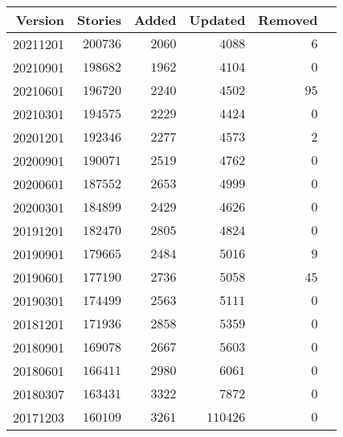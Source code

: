 \documentclass[hidelinks,a4paper,12pt]{article}
\begin{document}
\begin{center}
\begin{tabular}{|r|r|r|r|r|r|} \hline
\textbf{Version} & \textbf{Stories} & \textbf{Added} & \textbf{Updated} & \textbf{Removed} \\ \hline
20211201         & $200736$         & $2060$         & $4088$           & $6$              \\ \hline
20210901         & $198682$         & $1962$         & $4104$           & $0$              \\ \hline
20210601         & $196720$         & $2240$         & $4502$           & $95$             \\ \hline
20210301         & $194575$         & $2229$         & $4424$           & $0$              \\ \hline
20201201         & $192346$         & $2277$         & $4573$           & $2$              \\ \hline
20200901         & $190071$         & $2519$         & $4762$           & $0$              \\ \hline
20200601         & $187552$         & $2653$         & $4999$           & $0$              \\ \hline
20200301         & $184899$         & $2429$         & $4626$           & $0$              \\ \hline
20191201         & $182470$         & $2805$         & $4824$           & $0$              \\ \hline
20190901         & $179665$         & $2484$         & $5016$           & $9$              \\ \hline
20190601         & $177190$         & $2736$         & $5058$           & $45$             \\ \hline
20190301         & $174499$         & $2563$         & $5111$           & $0$              \\ \hline
20181201         & $171936$         & $2858$         & $5359$           & $0$              \\ \hline
20180901         & $169078$         & $2667$         & $5603$           & $0$              \\ \hline
20180601         & $166411$         & $2980$         & $6061$           & $0$              \\ \hline
20180307         & $163431$         & $3322$         & $7872$           & $0$              \\ \hline
20171203         & $160109$         & $3261$         & $110426$         & $0$              \\ \hline

\end{tabular}
\end{center}
\end{document}
